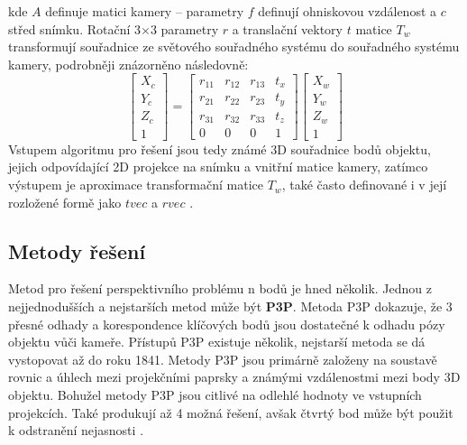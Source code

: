 kde $A$ definuje matici kamery -- parametry $f$ definují ohniskovou vzdálenost a $c$ střed snímku. Rotační 3$\times$3 parametry $r$ a translační vektory $t$ matice $T_w$ transformují souřadnice ze světového souřadného systému do souřadného systému kamery, podrobněji znázorněno následovně:
\begin{equation}
    \begin{bmatrix} X_c \\ Y_c \\ Z_c \\ 1 \end{bmatrix} = \begin{bmatrix} r_{11} & r_{12} & r_{13} & t_x \\ r_{21} & r_{22} & r_{23} & t_y \\ r_{31} & r_{32} & r_{33} & t_z \\ 0 & 0 & 0 & 1 \end{bmatrix} \begin{bmatrix} X_w \\ Y_w \\ Z_w \\ 1 \end{bmatrix}
\end{equation}
Vstupem algoritmu pro řešení jsou tedy známé 3D souřadnice bodů objektu, jejich odpovídající 2D projekce na snímku a vnitřní matice kamery, zatímco výstupem je aproximace transformační matice $T_w$, také často definované i v její rozložené formě jako $tvec$ a $rvec$ \cite{opencv_solvepnp}.
\subsection{Metody řešení}
Metod pro řešení perspektivního problému n bodů je hned několik. Jednou z nejjednodušších a nejstarších metod může být \textbf{P3P}. Metoda P3P dokazuje, že 3 přesné odhady a korespondence klíčových bodů jsou dostatečné k odhadu pózy objektu vůči kameře. Přístupů P3P existuje několik, nejstarší metoda se dá vystopovat až do roku 1841. Metody P3P jsou primárně založeny na soustavě rovnic a úhlech mezi projekčními paprsky a známými vzdálenostmi mezi body 3D objektu. Bohužel metody P3P jsou citlivé na odlehlé hodnoty ve vstupních projekcích. Také produkují až 4 možná řešení, avšak čtvrtý bod může být použit k odstranění nejasnosti \cite{shrestha2019pnp}.

